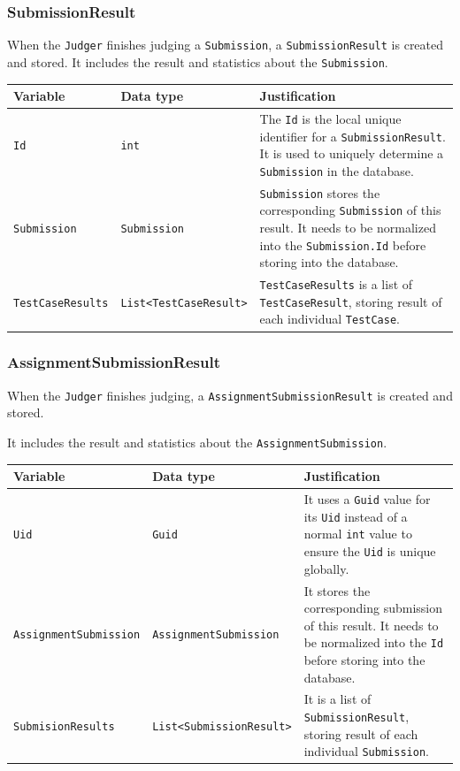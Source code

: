 \documentclass[a4paper]{report}
\newcommand{\code}{\texttt}
\begin{document}
\subsubsection{SubmissionResult}

When the \code{Judger} finishes judging a \code{Submission}, a \code{SubmissionResult} is created and stored. It includes the result and statistics about the \code{Submission}.

\begin{tabulary}{\textwidth}{|l|l|L|}
    \hline
    Variable & Data type & Justification \\
    \hline
    \code{Id} & \code{int} & The \code{Id} is the local unique identifier for a \code{SubmissionResult}. It is used to uniquely determine a \code{Submission} in the database.\\
    \hline
    \code{Submission} & \code{Submission} & \code{Submission} stores the corresponding \code{Submission} of this result. It needs to be normalized into the \code{Submission.Id} before storing into the database. \\
    \hline
    \code{TestCaseResults} & \code{List<TestCaseResult>} & \code{TestCaseResults} is a list of \code{TestCaseResult}, storing result of each individual \code{TestCase}. \\
    \hline
 \end{tabulary}

\subsubsection{AssignmentSubmissionResult}

When the \code{Judger} finishes judging, a \code{AssignmentSubmissionResult} is created and stored.

It includes the result and statistics about the \code{AssignmentSubmission}.

\begin{tabulary}{\textwidth}{|l|l|L|}
    \hline
    Variable & Data type & Justification \\
    \hline
    \code{Uid} & \code{Guid} & It uses a \code{Guid} value for its \code{Uid} instead of a normal \code{int} value to ensure the \code{Uid} is unique globally. \\
    \hline
    \code{AssignmentSubmission} & \code{AssignmentSubmission} & It stores the corresponding submission of this result. It needs to be normalized into the \code{Id} before storing into the database. \\
    \hline
    \code{SubmisionResults} & \code{List<SubmissionResult>} & It is a list of \code{SubmissionResult}, storing result of each individual \code{Submission}. \\
    \hline
\end{tabulary}
\end{document}
